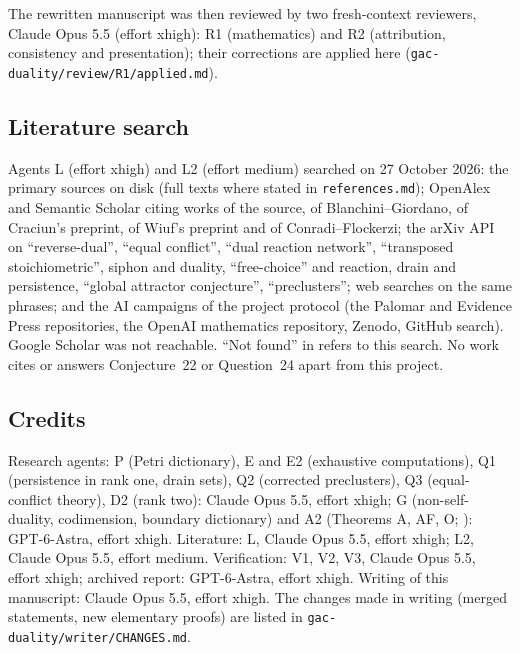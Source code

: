 \documentclass[11pt,a4paper]{report}
\begin{document}
The rewritten manuscript was then reviewed by two fresh-context reviewers, Claude Opus 5.5 (effort xhigh): R1
(mathematics) and R2 (attribution, consistency and presentation); their corrections are applied here
(\texttt{gac-duality/review/R1/applied.md}).

\subsection{Literature search}\label{sec:search}

Agents L (effort xhigh) and L2 (effort medium) searched on 27 October 2026: the primary sources on disk (full texts where
stated in \texttt{references.md}); OpenAlex and Semantic Scholar citing works of the source, of Blanchini--Giordano, of
Craciun's preprint, of Wiuf's preprint and of Conradi--Flockerzi; the arXiv API on ``reverse-dual'', ``equal conflict'',
``dual reaction network'', ``transposed stoichiometric'', siphon and duality, ``free-choice'' and reaction, drain and
persistence, ``global attractor conjecture'', ``preclusters''; web searches on the same phrases; and the AI campaigns of the
project protocol (the Palomar and Evidence Press repositories, the OpenAI mathematics repository, Zenodo, GitHub search).
Google Scholar was not reachable. ``Not found'' in  refers to this search. No work cites or answers
Conjecture~22 or Question~24 apart from this project.

\subsection{Credits}

Research agents: P (Petri dictionary), E and E2 (exhaustive computations), Q1 (persistence in rank one, drain sets), Q2
(corrected preclusters), Q3 (equal-conflict theory), D2 (rank two): Claude Opus 5.5, effort xhigh; G (non-self-duality,
codimension, boundary dictionary) and A2 (Theorems A, AF, O; ): GPT-6-Astra, effort xhigh. Literature:
L, Claude Opus 5.5, effort xhigh; L2, Claude Opus 5.5, effort medium. Verification: V1, V2, V3, Claude Opus 5.5, effort
xhigh; archived report: GPT-6-Astra, effort xhigh. Writing of this manuscript: Claude Opus 5.5, effort xhigh. The changes
made in writing (merged statements, new elementary proofs) are listed in \texttt{gac-duality/writer/CHANGES.md}.
\end{document}
